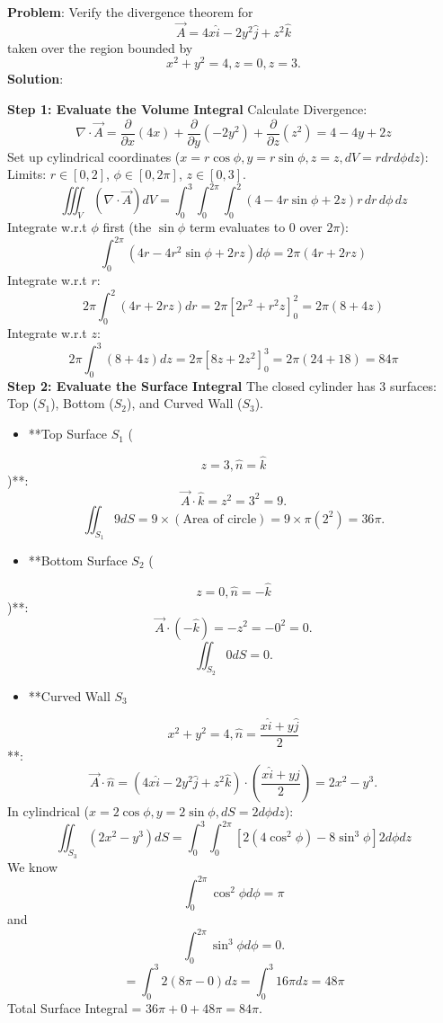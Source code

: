 \documentclass[
]{article}
\providecommand{\tightlist}{%
  \setlength{\itemsep}{0pt}\setlength{\parskip}{0pt}}
\begin{document}
\textbf{Problem}: Verify the divergence theorem for
\[
\vec{A} = 4x\hat{i} - 2y^2\hat{j} + z^2\hat{k}
\]
taken over the region bounded by
\[
x^2 + y^2 = 4, z = 0, z = 3.
\]
\textbf{Solution}:

\textbf{Step 1: Evaluate the Volume Integral} Calculate Divergence:
\[
\nabla \cdot \vec{A} = \frac{\partial}{\partial x}(4x) + \frac{\partial}{\partial y}(-2y^2) + \frac{\partial}{\partial z}(z^2) = 4 - 4y + 2z
\]
Set up cylindrical coordinates
(\(x = r\cos\phi, y = r\sin\phi, z = z, dV = r dr d\phi dz\)): Limits:
\(r \in [0, 2]\), \(\phi \in [0, 2\pi]\), \(z \in [0, 3]\).
\[
\iiint_V (\nabla \cdot \vec{A}) dV = \int_0^3 \int_0^{2\pi} \int_0^2 (4 - 4r\sin\phi + 2z) r \, dr \, d\phi \, dz
\]
Integrate w.r.t \(\phi\) first (the \(\sin\phi\) term evaluates to 0
over \(2\pi\)):
\[
\int_0^{2\pi} (4r - 4r^2\sin\phi + 2rz) d\phi = 2\pi(4r + 2rz)
\]
Integrate w.r.t \(r\):
\[
2\pi \int_0^2 (4r + 2rz) dr = 2\pi [2r^2 + r^2 z]_0^2 = 2\pi(8 + 4z)
\]
Integrate w.r.t \(z\):
\[
2\pi \int_0^3 (8 + 4z) dz = 2\pi [8z + 2z^2]_0^3 = 2\pi(24 + 18) = 84\pi
\]
\textbf{Step 2: Evaluate the Surface Integral} The closed cylinder has 3
surfaces: Top (\(S_1\)), Bottom (\(S_2\)), and Curved Wall (\(S_3\)).

\begin{itemize}
\tightlist
\item
  **Top Surface \(S_1\) (
\end{itemize}
\[
z=3, \hat{n}=\hat{k}
\]
)**:
\[
\vec{A} \cdot \hat{k} = z^2 = 3^2 = 9.
\]
\[
\iint_{S_1} 9 dS = 9 \times (\text{Area of circle}) = 9 \times \pi(2^2) = 36\pi.
\]
\begin{itemize}
\tightlist
\item
  **Bottom Surface \(S_2\) (
\end{itemize}
\[
z=0, \hat{n}=-\hat{k}
\]
)**:
\[
\vec{A} \cdot (-\hat{k}) = -z^2 = -0^2 = 0.
\]
\[
\iint_{S_2} 0 dS = 0.
\]
\begin{itemize}
\tightlist
\item
  **Curved Wall \(S_3\)
\end{itemize}
\[
x^2+y^2=4, \hat{n}=\frac{x\hat{i}+y\hat{j}}{2}
\]
**:
\[
\vec{A} \cdot \hat{n} = (4x\hat{i} - 2y^2\hat{j} + z^2\hat{k}) \cdot \left( \frac{x\hat{i} + y\hat{j}}{2} \right) = 2x^2 - y^3.
\]
In cylindrical (\(x=2\cos\phi, y=2\sin\phi, dS = 2 d\phi dz\)):
\[
\iint_{S_3} (2x^2 - y^3) dS = \int_0^3 \int_0^{2\pi} \left[ 2(4\cos^2\phi) - 8\sin^3\phi \right] 2 d\phi dz
\]
We know
\[
\int_0^{2\pi} \cos^2\phi d\phi = \pi
\]
and
\[
\int_0^{2\pi} \sin^3\phi d\phi = 0.
\]
\[
= \int_0^3 2(8\pi - 0) dz = \int_0^3 16\pi dz = 48\pi
\]
Total Surface Integral = \(36\pi + 0 + 48\pi = 84\pi\).
\end{document}
